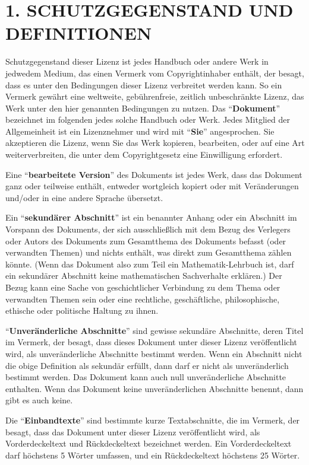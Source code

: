 \section*{1. SCHUTZGEGENSTAND UND DEFINITIONEN}

Schutzgegenstand dieser Lizenz ist jedes Handbuch oder andere Werk in jedwedem Medium, das
einen Vermerk vom Copyrightinhaber enthält, der besagt, dass es unter den
Bedingungen dieser Lizenz verbreitet werden kann. So ein Vermerk gewährt eine
weltweite, gebührenfreie, zeitlich unbeschränkte Lizenz, das Werk unter den hier
genannten Bedingungen zu nutzen. Das "`\textbf{Dokument}"' bezeichnet im folgenden
jedes solche Handbuch oder Werk. Jedes Mitglied der Allgemeinheit ist ein Lizenznehmer
und wird mit "`\textbf{Sie}"' angesprochen. Sie akzeptieren die Lizenz, wenn
Sie das Werk kopieren, bearbeiten, oder auf eine Art weiterverbreiten, die unter
dem Copyrightgesetz eine Einwilligung erfordert.

Eine "`\textbf{bearbeitete Version}"' des Dokuments ist jedes Werk, dass das Dokument 
ganz oder teilweise enthält, entweder wortgleich kopiert oder mit 
Veränderungen und/oder in eine andere Sprache übersetzt.

Ein "`\textbf{sekundärer Abschnitt}"' ist ein benannter Anhang oder ein Abschnitt im Vorspann
des Dokuments, der sich ausschließlich mit dem Bezug des 
Verlegers oder Autors des Dokuments zum Gesamtthema des Dokuments befasst
(oder verwandten Themen) und nichts enthält, was direkt zum Gesamtthema
zählen könnte. (Wenn das Dokument also zum Teil ein Mathematik-Lehrbuch
ist, darf ein sekundärer Abschnitt keine mathematischen Sachverhalte erklären.)
Der Bezug kann eine Sache von geschichtlicher Verbindung zu dem Thema oder
verwandten Themen sein oder eine rechtliche, geschäftliche, philosophische, 
ethische oder politische Haltung zu ihnen.

"`\textbf{Unveränderliche Abschnitte}"' sind gewisse sekundäre Abschnitte, deren Titel
im Vermerk, der besagt, dass dieses Dokument unter dieser Lizenz veröffentlicht wird,
als unveränderliche Abschnitte bestimmt werden. Wenn ein Abschnitt nicht die obige
Definition als sekundär erfüllt, dann darf er nicht als unveränderlich bestimmt werden.
Das Dokument kann auch null unveränderliche Abschnitte enthalten.
Wenn das Dokument keine unveränderlichen Abschnitte benennt, dann gibt es auch keine.

Die "`\textbf{Einbandtexte}"' sind bestimmte kurze Textabschnitte, die im
Vermerk, der besagt, dass das Dokument unter dieser Lizenz veröffentlicht wird,
als Vorderdeckeltext und Rückdeckeltext bezeichnet werden. Ein Vorderdeckeltext
darf höchstens 5 Wörter umfassen, und ein Rückdeckeltext höchstens 25 Wörter.

